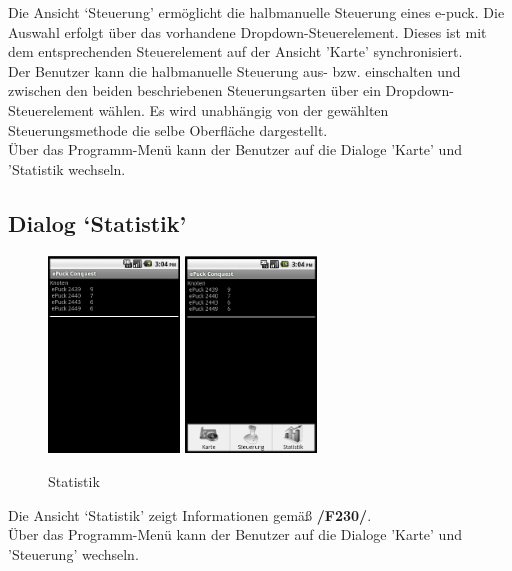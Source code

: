 \documentclass[10pt,a4paper]{article}
\begin{document}
			Die Ansicht `Steuerung' ermöglicht die halbmanuelle Steuerung eines e-puck. Die Auswahl erfolgt über das vorhandene
			Dropdown-Steuerelement. Dieses ist mit dem entsprechenden Steuerelement auf der Ansicht 'Karte' synchronisiert.	\\ 
			Der Benutzer kann die halbmanuelle Steuerung	aus- bzw. einschalten und zwischen den beiden beschriebenen
			Steuerungsarten über ein Dropdown-Steuerelement wählen. Es wird unabhängig von der gewählten Steuerungsmethode die selbe
			Oberfläche dargestellt. \\
			Über das Programm-Menü kann der Benutzer auf die Dialoge 'Karte' und 'Statistik wechseln.

			\subsection{Dialog `Statistik'}
				\begin{figure}[h]
					  \centering
					\includegraphics[width=3.5cm]{screenshots_neu/stats_bmp.png}
					\includegraphics[width=3.5cm]{screenshots_neu/stats_menu.png}
  					\caption{Statistik}
  				\end{figure}		
  				
  			Die Ansicht `Statistik' zeigt Informationen gemäß \textbf{/F230/}. \\
  			
  			Über das Programm-Menü kann der Benutzer auf die Dialoge 'Karte' und 'Steuerung' wechseln.
			
\end{document}
